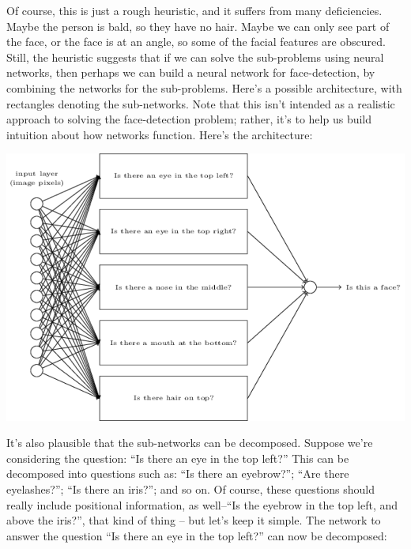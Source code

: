 \documentclass[a4paper,twoside,10pt]{book}
\begin{document}
Of course, this is just a rough heuristic, and it suffers from many deficiencies. Maybe the person is bald, so they have no hair. Maybe we can only see part of the face, or the face is at an angle, so some of the facial features are obscured. Still, the heuristic suggests that if we can solve the sub-problems using neural networks, then perhaps we can build a neural network for face-detection, by combining the networks for the sub-problems. Here's a possible architecture, with rectangles denoting the sub-networks. Note that this isn't intended as a realistic approach to solving the face-detection problem; rather, it's to help us build intuition about how networks function. Here's the architecture:

\begin{center}
	\includegraphics[width=\linewidth]{./figures/ch1/tikz14}
\end{center}
It's also plausible that the sub-networks can be decomposed. Suppose we're considering the question: ``Is there an eye in the top left?'' This can be decomposed into questions such as: ``Is there an eyebrow?''; ``Are there eyelashes?''; ``Is there an iris?''; and so on. Of course, these questions should really include positional information, as well--``Is the eyebrow in the top left, and above the iris?'', that kind of thing -- but let's keep it simple. The network to answer the question ``Is there an eye in the top left?'' can now be decomposed:
\end{document}
